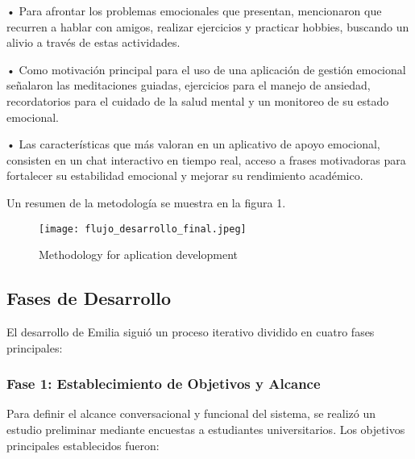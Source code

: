 \documentclass[conference]{IEEEtran}
\begin{document}
•	Para afrontar los problemas emocionales que presentan, mencionaron que recurren a hablar con amigos, realizar ejercicios y practicar hobbies, buscando un alivio a través de estas actividades.

•	Como motivación principal para el uso de una aplicación de gestión emocional señalaron las meditaciones guiadas, ejercicios para el manejo de ansiedad, recordatorios para el cuidado de la salud mental y un monitoreo de su estado emocional.

•	Las características que más valoran en un aplicativo de apoyo emocional, consisten en un chat interactivo en tiempo real, acceso a frases motivadoras para fortalecer su estabilidad emocional y mejorar su rendimiento académico.


Un resumen de la metodología se muestra en la figura 1.

\begin{figure}[h]
\centering
\texttt{[image: flujo\_desarrollo\_final.jpeg]}
\caption{Methodology for aplication development}
\label{flujo_desarrollo_final}
\end{figure}

\subsection{Fases de Desarrollo}
El desarrollo de Emilia siguió un proceso iterativo dividido en cuatro fases principales:

\subsubsection{Fase 1: Establecimiento de Objetivos y Alcance}
Para definir el alcance conversacional y funcional del sistema, se realizó un estudio preliminar mediante encuestas a estudiantes universitarios. Los objetivos principales establecidos fueron:
\end{document}
